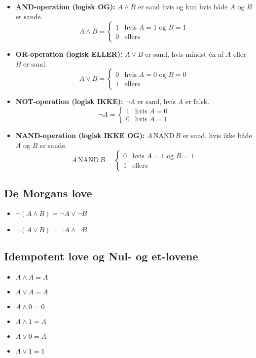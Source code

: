 \documentclass{article}
\begin{document}
\begin{itemize}
    \item \textbf{AND-operation (logisk OG):} \( A \land B \) er sand hvis og kun hvis både \( A \) og \( B \) er sande.
    \[ A \land B = 
    \begin{cases} 
    1 & \text{hvis } A = 1 \text{ og } B = 1 \\
    0 & \text{ellers}
    \end{cases}
    \]

    \item \textbf{OR-operation (logisk ELLER):} \( A \lor B \) er sand, hvis mindst én af \( A \) eller \( B \) er sand.
    \[ A \lor B = 
    \begin{cases} 
    0 & \text{hvis } A = 0 \text{ og } B = 0 \\
    1 & \text{ellers}
    \end{cases}
    \]

    \item \textbf{NOT-operation (logisk IKKE):} \( \neg A \) er sand, hvis \( A \) er falsk.
    \[ \neg A = 
    \begin{cases} 
    1 & \text{hvis } A = 0 \\
    0 & \text{hvis } A = 1
    \end{cases}
    \]

    \item \textbf{NAND-operation (logisk IKKE OG):} \( A \, \text{NAND} \, B \) er sand, hvis ikke både \( A \) og \( B \) er sande.
    \[ A \, \text{NAND} \, B = 
    \begin{cases} 
    0 & \text{hvis } A = 1 \text{ og } B = 1 \\
    1 & \text{ellers}
    \end{cases}
    \]
\end{itemize}

\subsection{De Morgans love}

\begin{itemize}
    \item \( \neg (A \land B) = \neg A \lor \neg B \)
    \item \( \neg (A \lor B) = \neg A \land \neg B \)
\end{itemize}

\subsection{Idempotent love og Nul- og et-lovene}

\begin{itemize}
    \item \( A \land A = A \)
    \item \( A \lor A = A \)
    \item \( A \land 0 = 0 \)
    \item \( A \land 1 = A \)
    \item \( A \lor 0 = A \)
    \item \( A \lor 1 = 1 \)
\end{itemize}
\end{document}
